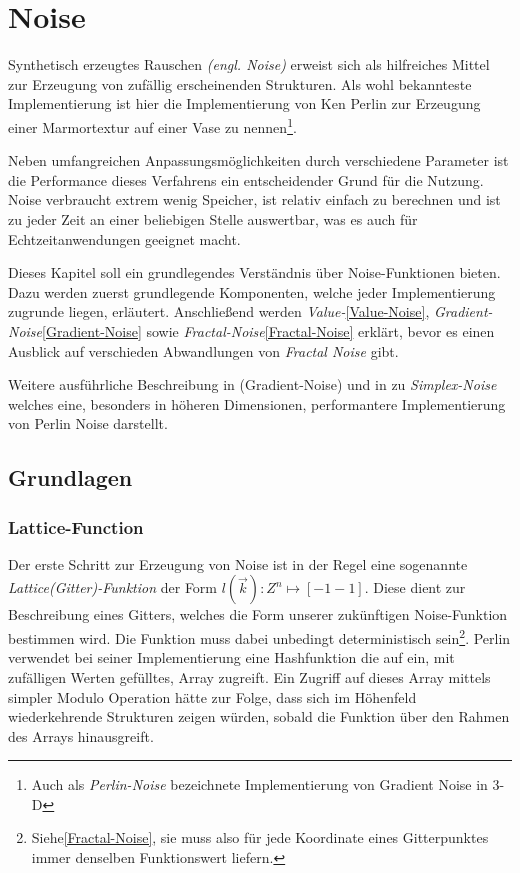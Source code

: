 \chapter{Noise}
Synthetisch erzeugtes Rauschen \emph{(engl. Noise)} erweist sich als hilfreiches Mittel zur Erzeugung von zufällig erscheinenden Strukturen.
Als wohl bekannteste Implementierung ist hier die Implementierung von Ken Perlin\cite{PERLIN1985} zur Erzeugung einer Marmortextur auf einer Vase zu nennen\footnote{Auch als \emph{Perlin-Noise} bezeichnete Implementierung von Gradient Noise in 3-D}.

Neben umfangreichen Anpassungsmöglichkeiten durch verschiedene Parameter ist die Performance dieses Verfahrens ein entscheidender Grund für die Nutzung. Noise verbraucht extrem wenig Speicher, ist relativ einfach zu berechnen und ist zu jeder Zeit an einer beliebigen Stelle auswertbar, was es auch für Echtzeitanwendungen geeignet macht.\cite{H.Hauser2010}

Dieses Kapitel soll ein grundlegendes Verständnis über Noise-Funktionen bieten. Dazu werden zuerst grundlegende Komponenten, welche jeder Implementierung zugrunde liegen, erläutert. Anschließend werden \emph{Value-}\ref{Value-Noise}, \emph{Gradient-Noise}\ref{Gradient-Noise} sowie \emph{Fractal-Noise}\ref{Fractal-Noise} erklärt, bevor es einen Ausblick auf verschieden Abwandlungen von \emph{Fractal Noise} gibt.

Weitere ausführliche Beschreibung in \cite{BurgerGradientNoise2008} (Gradient-Noise) und in \cite{simplexNoise} zu \emph{Simplex-Noise} welches eine, besonders in höheren Dimensionen, performantere Implementierung von Perlin Noise darstellt.

\section{Grundlagen}
\subsection{Lattice-Function}\label{latticeFunc}
Der erste Schritt zur Erzeugung von Noise ist in der Regel eine sogenannte \emph{Lattice(Gitter)-Funktion}\cite{fractalsAndChaos} der Form \begin{math}l(\vec{k}): {Z}^n \mapsto [-1 - 1]\end{math}\label{latticeFunc}.
Diese dient zur Beschreibung eines Gitters, welches die Form unserer zukünftigen Noise-Funktion bestimmen wird. Die Funktion muss dabei unbedingt deterministisch sein\footnote{Siehe\ref{Fractal-Noise}, sie muss also für jede Koordinate eines Gitterpunktes immer denselben Funktionswert liefern.}. Perlin verwendet bei seiner Implementierung eine Hashfunktion die auf ein, mit zufälligen Werten gefülltes, Array zugreift. Ein Zugriff auf dieses Array mittels simpler Modulo Operation hätte zur Folge, dass sich im Höhenfeld wiederkehrende Strukturen zeigen würden, sobald die Funktion über den Rahmen des Arrays hinausgreift.


